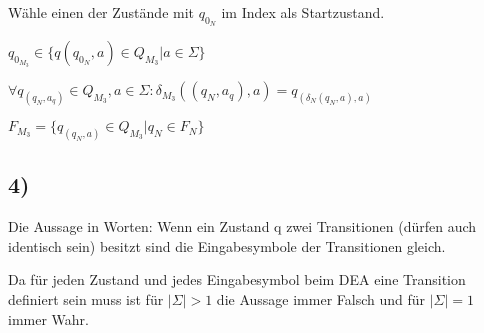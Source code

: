 Wähle einen der Zustände mit $q_{0_N}$ im Index als Startzustand.

$q_{0_{M_3}} \in \{q(q_{0_N},a) \in Q_{M_3}| a \in \Sigma \}$

$\forall q_{(q_N,a_q)} \in Q_{M_3}, a \in \Sigma: 
\delta_{M_3}((q_N,a_q),a) = q_{(\delta_N(q_N,a),a)} $


$F_{M_3} = \{q_{(q_N,a)} \in Q_{M_3} | q_N \in F_N\}$

\subsection*{4)}

Die Aussage in Worten: Wenn ein Zustand q zwei Transitionen (dürfen auch identisch sein) besitzt sind die Eingabesymbole der Transitionen gleich.

Da für jeden Zustand und jedes Eingabesymbol beim DEA eine Transition definiert sein muss ist für $|\Sigma|>1$ die Aussage immer Falsch und für $|\Sigma| = 1$ immer Wahr.